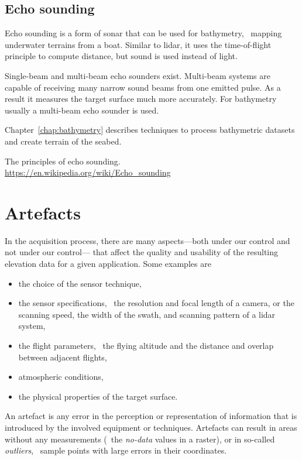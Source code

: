 \subsection{Echo sounding}%
\label{sec:mbes}
Echo sounding is a form of sonar that can be used for bathymetry, \ie\ mapping underwater terrains from a boat. 
Similar to lidar, it uses the time-of-flight principle to compute distance, but sound is used instead of light. 

Single-beam and multi-beam echo sounders exist. Multi-beam systems are capable of receiving many narrow sound beams from one emitted pulse. As a result it measures the target surface much more accurately. 
For bathymetry usually a multi-beam echo sounder is used.

Chapter~\ref{chap:bathymetry} describes techniques to process bathymetric datasets and create terrain of the seabed.

\begin{kaobox}[frametitle=\faExternalLink\ To read or to watch.]
  The principles of echo sounding.
  \\
  \url{https://en.wikipedia.org/wiki/Echo_sounding}
\end{kaobox}




\section{Artefacts}%
\label{sec:artefacts}

In the acquisition process, there are many aspects---both under our control and not under our control--- that affect the quality and usability of the resulting elevation data for a given application. 
Some examples are
\begin{itemize}
	\item the choice of the sensor technique, 
	\item the sensor specifications, \eg\ the resolution and focal length of a camera, or the scanning speed, the width of the swath, and scanning pattern of a lidar system,
	\item the flight parameters, \eg\ the flying altitude and the distance and overlap between adjacent flights,
	\item atmospheric conditions, 
	\item the physical properties of the target surface.
\end{itemize}

An artefact is any error in the perception or representation of information that is introduced by the involved equipment or techniques. 
Artefacts can result in areas without any measurements (\eg\ the \emph{no-data} values in a raster), or in so-called \emph{outliers}, \ie\ sample points with large errors in their coordinates. 


